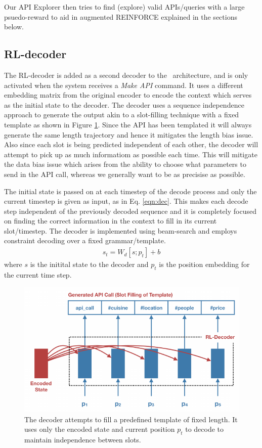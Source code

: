 Our API Explorer then tries to find (explore) valid APIs/queries with a large psuedo-reward to aid in augmented REINFORCE explained in the sections below.

\subsection{RL-decoder}
\label{ssec:rldecode}
The RL-decoder is added as a second decoder to the \sys\ architecture, and is only activated when the system receives a {\em Make API} command. It uses a different embedding matrix from the original encoder to encode the context which serves as the initial state to the decoder. The decoder uses a sequence independence approach to generate the output akin to a slot-filling technique with a fixed template as shown in Figure \ref{fig:rldec}. Since the API has been templated it will always generate the same length trajectory and hence it mitigates the length bias issue. Also since each slot is being predicted independent of each other, the decoder will attempt to pick up as much informatiom as possible each time. This will mitigate the data bias issue which arises from the ability to choose what parameters to send in the API call, whereas we generally want to be as precisise as possible.

The initial state is passed on at each timestep of the decode process and only the current timestep is given as input, as in Eq. \ref{eqn:dec}. This makes each decode step independent of the previously decoded sequence and it is completely focused on finding the correct information in the context to fill in its current slot/timestep. The decoder is implemented using beam-search and employs constraint decoding over a fixed grammar/template.
\begin{eqnarray}
s_{t} = W_d [s;p_t] + b \label{eqn:dec}
\end{eqnarray}
where $s$ is the initital state to the decoder and $p_t$ is the position embedding for the current time step.

\begin{figure}[!t]
\centering
\includegraphics[scale=1.1]{assets/figures/rl_decoder.pdf}
\caption{The decoder attempts to fill a predefined template of fixed length. It uses only the encoded state and current position $p_t$ to decode to maintain independence between slots.}
\label{fig:rldec}
\end{figure}

